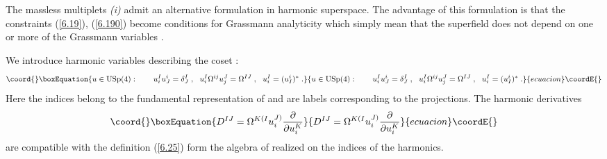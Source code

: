 \documentclass[a4paper,11pt]{article}
\begin{document}
The massless multiplets {\sl (i)} admit an alternative formulation
in harmonic superspace. The advantage of this formulation is that
the constraints (\ref{6.19}), (\ref{6.190}) become conditions for
Grassmann analyticity which simply mean that the superfield does
not depend on one or more of the Grassmann variables
\myHighlight{$\theta^\alpha$}\coordHE{}.

We introduce harmonic variables describing the coset
\coordHE{}:
\begin{equation}\coord{}\boxEquation{\label{6.25}
  u\in {\mbox{USp}}(4): \qquad u^I_iu^i_J = \delta^I_J\;,
\ \ u^I_i \Omega^{ij}u^J_j = \Omega^{IJ}\;, \ \  u^I_i= (u^i_I)^*\;.
}{u\in {\mbox{USp}}(4): \qquad u^I_iu^i_J = \delta^I_J\;,
\ \ u^I_i \Omega^{ij}u^J_j = \Omega^{IJ}\;, \ \  u^I_i= (u^i_I)^*\;.
}{ecuacion}\coordE{}\end{equation}
Here the indices \coordHE{} belong to the fundamental representation of
\coordHE{} and \coordHE{} are labels corresponding to the \coordHE{} projections. The harmonic derivatives
\begin{equation}\coord{}\boxEquation{\label{6.26}
  D^{IJ} = \Omega^{K(I}u^{J)}_i \frac{\partial}{\partial u^K_i}
}{D^{IJ} = \Omega^{K(I}u^{J)}_i \frac{\partial}{\partial u^K_i}
}{ecuacion}\coordE{}\end{equation}
are compatible with the definition (\ref{6.25}) form the algebra
of \coordHE{} realized on the indices \coordHE{} of the
harmonics.
\end{document}

